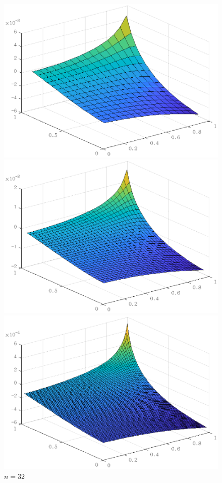 \documentclass[lang=cn,11pt,a4paper]{elegantpaper}
\begin{document}
\begin{figure}[htbp]
  \centering
  \begin{minipage}[t]{0.24\linewidth}
      \centering
      \includegraphics[width=0.95\linewidth]{figure/error_problem1_N_r_n=16.eps}
      \caption*{$n=16$}
  \end{minipage}
  \begin{minipage}[t]{0.24\linewidth}
    \centering
    \includegraphics[width=0.95\linewidth]{figure/error_problem1_N_r_n=32.eps}
    \caption*{$n=32$}
  \end{minipage}
  \begin{minipage}[t]{0.24\linewidth}
    \centering
    \includegraphics[width=0.95\linewidth]{figure/error_problem1_N_r_n=64.eps}

\end{minipage}
\end{figure}
\end{document}
